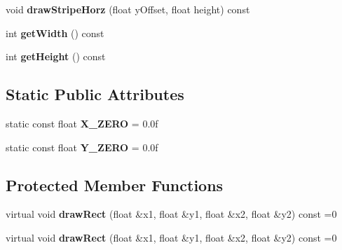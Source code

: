 \begin{DoxyCompactItemize}
\item 
\hypertarget{class_renderer___a_a70ea4a1396787e8a3c59c848a6aeabcd}{void {\bfseries draw\-Stripe\-Horz} (float y\-Offset, float height) const }\label{class_renderer___a_a70ea4a1396787e8a3c59c848a6aeabcd}

\item 
\hypertarget{class_renderer___a_a79fb640a6c4a733647f3bc5cd96c3bad}{int {\bfseries get\-Width} () const }\label{class_renderer___a_a79fb640a6c4a733647f3bc5cd96c3bad}

\item 
\hypertarget{class_renderer___a_a69aeb74354637f5d9d7a5508f00dde33}{int {\bfseries get\-Height} () const }\label{class_renderer___a_a69aeb74354637f5d9d7a5508f00dde33}

\end{DoxyCompactItemize}
\subsection*{Static Public Attributes}
\begin{DoxyCompactItemize}
\item 
\hypertarget{class_renderer___a_aeab3b86fbef2f719f01fdbf0792d4848}{static const float {\bfseries X\-\_\-\-Z\-E\-R\-O} = 0.\-0f}\label{class_renderer___a_aeab3b86fbef2f719f01fdbf0792d4848}

\item 
\hypertarget{class_renderer___a_ac2d79b93854681441cb48f96cb7e9f93}{static const float {\bfseries Y\-\_\-\-Z\-E\-R\-O} = 0.\-0f}\label{class_renderer___a_ac2d79b93854681441cb48f96cb7e9f93}

\end{DoxyCompactItemize}
\subsection*{Protected Member Functions}
\begin{DoxyCompactItemize}
\item 
\hypertarget{class_renderer___a_aaaec84a39a7a49825b7513c12812740d}{virtual void {\bfseries draw\-Rect} (float \&x1, float \&y1, float \&x2, float \&y2) const =0}\label{class_renderer___a_aaaec84a39a7a49825b7513c12812740d}

\item 
\hypertarget{class_renderer___a_aaaec84a39a7a49825b7513c12812740d}{virtual void {\bfseries draw\-Rect} (float \&x1, float \&y1, float \&x2, float \&y2) const =0}\label{class_renderer___a_aaaec84a39a7a49825b7513c12812740d}

\end{DoxyCompactItemize}
